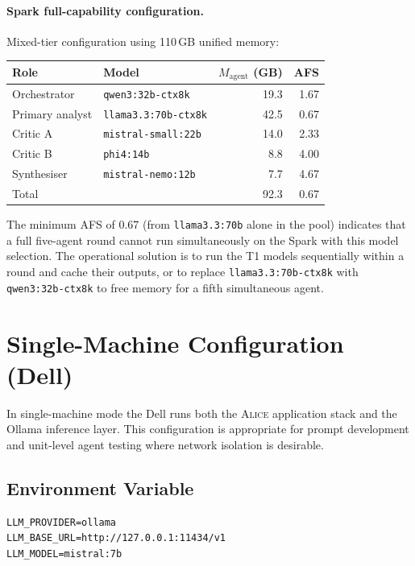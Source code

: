 \paragraph{Spark full-capability configuration.}
Mixed-tier configuration using 110\,GB unified memory:

\begin{center}
\begin{tabular}{llrr}
\toprule
Role & Model & $M_{\text{agent}}$ (GB) & AFS \\
\midrule
Orchestrator    & \texttt{qwen3:32b-ctx8k}            & 19.3 & 1.67 \\
Primary analyst & \texttt{llama3.3:70b-ctx8k}         & 42.5 & 0.67 \\
Critic A        & \texttt{mistral-small:22b}           & 14.0 & 2.33 \\
Critic B        & \texttt{phi4:14b}                   &  8.8 & 4.00 \\
Synthesiser     & \texttt{mistral-nemo:12b}            &  7.7 & 4.67 \\
\midrule
Total           &                                      & 92.3 & 0.67 \\
\bottomrule
\end{tabular}
\end{center}

\noindent The minimum AFS of 0.67 (from \texttt{llama3.3:70b} alone in
the pool) indicates that a full five-agent round cannot run simultaneously
on the Spark with this model selection. The operational solution is to
run the T1 models sequentially within a round and cache their outputs, or
to replace \texttt{llama3.3:70b-ctx8k} with \texttt{qwen3:32b-ctx8k} to
free memory for a fifth simultaneous agent.

\section{Single-Machine Configuration (Dell)}
\label{sec:single}

In single-machine mode the Dell runs both the \textsc{Alice} application
stack and the Ollama inference layer. This configuration is appropriate
for prompt development and unit-level agent testing where network
isolation is desirable.

\subsection{Environment Variable}

\begin{lstlisting}[style=bashstyle, caption={.env for single-machine mode}]
LLM_PROVIDER=ollama
LLM_BASE_URL=http://127.0.0.1:11434/v1
LLM_MODEL=mistral:7b
\end{lstlisting}

